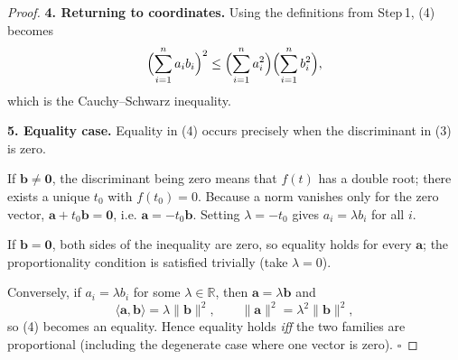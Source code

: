 \begin{proof}
\textbf{4. Returning to coordinates.}  
Using the definitions from Step 1, (4) becomes
\[
\Bigl(\sum_{i=1}^{n}a_{i}b_{i}\Bigr)^{2}
\le
\Bigl(\sum_{i=1}^{n}a_{i}^{2}\Bigr)
\Bigl(\sum_{i=1}^{n}b_{i}^{2}\Bigr),
\]
which is the Cauchy–Schwarz inequality.

\textbf{5. Equality case.}  
Equality in (4) occurs precisely when the discriminant in (3) is zero.

If \(\mathbf b\neq\mathbf 0\), the discriminant being zero means that \(f(t)\) has a double root; there exists a unique \(t_{0}\) with \(f(t_{0})=0\). Because a norm vanishes only for the zero vector, \(\mathbf a+t_{0}\mathbf b=\mathbf 0\), i.e. \(\mathbf a=-t_{0}\mathbf b\). Setting \(\lambda=-t_{0}\) gives \(a_{i}= \lambda b_{i}\) for all \(i\).

If \(\mathbf b=\mathbf 0\), both sides of the inequality are zero, so equality holds for every \(\mathbf a\); the proportionality condition is satisfied trivially (take \(\lambda=0\)).

Conversely, if \(a_{i}= \lambda b_{i}\) for some \(\lambda\in\mathbb R\), then \(\mathbf a=\lambda\mathbf b\) and
\[
\langle\mathbf a,\mathbf b\rangle=\lambda\|\mathbf b\|^{2},
\qquad
\|\mathbf a\|^{2}= \lambda^{2}\|\mathbf b\|^{2},
\]
so (4) becomes an equality. Hence equality holds \emph{iff} the two families are proportional (including the degenerate case where one vector is zero). \(\square\)
\end{proof}